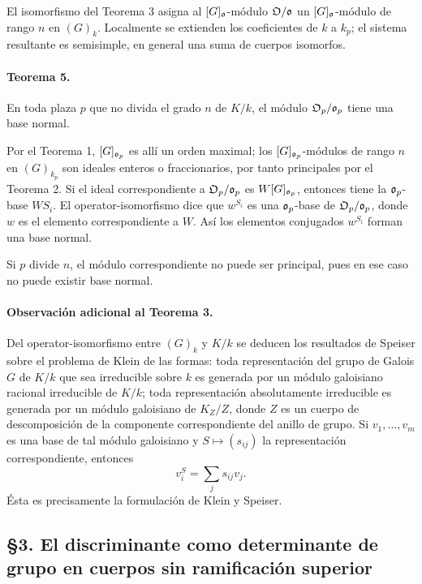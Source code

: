 El isomorfismo del Teorema 3 asigna al \([G]_{\mathfrak o}\)-módulo \(\mathfrak O/\mathfrak o\) un \([G]_{\mathfrak o}\)-módulo de rango \(n\) en \((G)_k\). Localmente se extienden los coeficientes de \(k\) a \(k_p\); el sistema resultante es semisimple, en general una suma de cuerpos isomorfos.

\paragraph{Teorema 5.}
En toda plaza \(p\) que no divida el grado \(n\) de \(K/k\), el módulo \(\mathfrak O_p/\mathfrak o_p\) tiene una base normal.

Por el Teorema 1, \([G]_{\mathfrak o_p}\) es allí un orden maximal; los \([G]_{\mathfrak o_p}\)-módulos de rango \(n\) en \((G)_{k_p}\) son ideales enteros o fraccionarios, por tanto principales por el Teorema 2. Si el ideal correspondiente a \(\mathfrak O_p/\mathfrak o_p\) es \(W[G]_{\mathfrak o_p}\), entonces tiene la \(\mathfrak o_p\)-base \(WS_i\). El operator-isomorfismo dice que \(w^{S_i}\) es una \(\mathfrak o_p\)-base de \(\mathfrak O_p/\mathfrak o_p\), donde \(w\) es el elemento correspondiente a \(W\). Así los elementos conjugados \(w^{S_i}\) forman una base normal.

Si \(p\) divide \(n\), el módulo correspondiente no puede ser principal, pues en ese caso no puede existir base normal.

\paragraph{Observación adicional al Teorema 3.}
Del operator-isomorfismo entre \((G)_k\) y \(K/k\) se deducen los resultados de Speiser sobre el problema de Klein de las formas: toda representación del grupo de Galois \(G\) de \(K/k\) que sea irreducible sobre \(k\) es generada por un módulo galoisiano racional irreducible de \(K/k\); toda representación absolutamente irreducible es generada por un módulo galoisiano de \(K_Z/Z\), donde \(Z\) es un cuerpo de descomposición de la componente correspondiente del anillo de grupo. Si \(v_1,\ldots,v_m\) es una base de tal módulo galoisiano y \(S\mapsto (s_{ij})\) la representación correspondiente, entonces
\[
        v_i^S=\sum_j s_{ij}v_j.
\]
Ésta es precisamente la formulación de Klein y Speiser.

\subsection*{§3. El discriminante como determinante de grupo en cuerpos sin ramificación superior}

